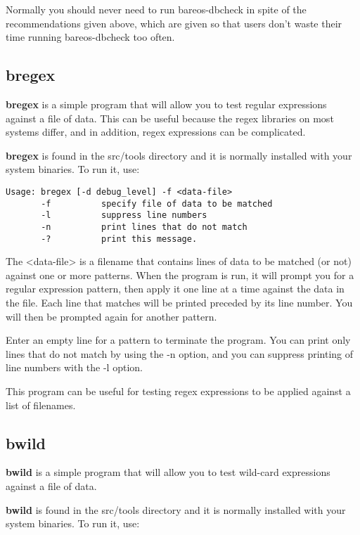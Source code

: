 Normally
you should never need to run bareos-dbcheck in spite of the
recommendations given above, which are given so that users don't
waste their time running bareos-dbcheck too often.

\subsection{bregex}
\label{bregex}

{\bf bregex} is a simple program that will allow you to test
regular expressions against a file of data. This can be useful
because the regex libraries on most systems differ, and in
addition, regex expressions can be complicated.

{\bf bregex} is found in the src/tools directory and it is
normally installed with your system binaries. To run it, use:

\begin{verbatim}
Usage: bregex [-d debug_level] -f <data-file>
       -f          specify file of data to be matched
       -l          suppress line numbers
       -n          print lines that do not match
       -?          print this message.
\end{verbatim}

The {\textless}data-file{\textgreater} is a filename that contains lines
of data to be matched (or not) against one or more patterns.
When the program is run, it will prompt you for a regular
expression pattern, then apply it one line at a time against
the data in the file. Each line that matches will be printed
preceded by its line number.  You will then be prompted again
for another pattern.

Enter an empty line for a pattern to terminate the program. You
can print only lines that do not match by using the -n option,
and you can suppress printing of line numbers with the -l option.

This program can be useful for testing regex expressions to be
applied against a list of filenames.

\subsection{bwild}
\label{bwild}

{\bf bwild} is a simple program that will allow you to test
wild-card expressions against a file of data.

{\bf bwild} is found in the src/tools directory and it is
normally installed with your system binaries. To run it, use:

